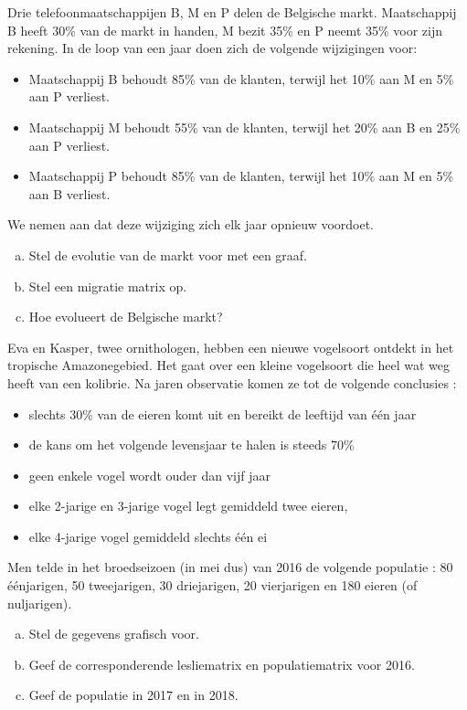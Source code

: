 \documentclass[12pt,twoside]{article}
\begin{document}
\begin{oefening}%
Drie telefoonmaatschappijen B, M en P delen de Belgische markt. Maatschappij B heeft 30\% van de markt in handen, M bezit 35\% en P neemt 35\% voor zijn rekening. In de loop van een jaar doen zich de volgende wijzigingen voor:
\begin{itemize}
  \item Maatschappij B behoudt 85\% van de klanten, terwijl het 10\% aan M en 5\% aan P verliest.
  \item Maatschappij M behoudt 55\% van de klanten, terwijl het 20\% aan B en 25\% aan P verliest.
  \item Maatschappij P behoudt 85\% van de klanten, terwijl het 10\% aan M en 5\% aan B verliest.
\end{itemize}
We nemen aan dat deze wijziging zich elk jaar opnieuw voordoet.

\begin{enumerate}[(a)]
  \item Stel de evolutie van de markt voor met een graaf.
  \item Stel een migratie matrix op.
  \item Hoe evolueert de Belgische markt?
\end{enumerate}
\end{oefening}

\begin{oefening}
Eva en Kasper, twee ornithologen, hebben een nieuwe vogelsoort ontdekt in het tropische Amazonegebied.  Het gaat over een kleine vogelsoort die heel wat weg heeft van een kolibrie.  Na jaren observatie komen ze tot de volgende conclusies :
\begin{itemize}
  \item slechts 30\% van de eieren komt uit en bereikt de leeftijd van één jaar
  \item de kans om het volgende levensjaar te halen is steeds 70\%
  \item geen enkele vogel wordt ouder dan vijf jaar
  \item elke 2-jarige en 3-jarige vogel legt gemiddeld twee eieren,
  \item elke 4-jarige vogel gemiddeld slechts één ei
\end{itemize}
Men telde in het broedseizoen (in mei dus) van 2016 de volgende populatie :
80 éénjarigen, 50 tweejarigen, 30 driejarigen, 20 vierjarigen en 180 eieren (of nuljarigen).

\begin{enumerate}[(a)]
  \item Stel de gegevens grafisch voor.
  \item Geef de corresponderende lesliematrix en populatiematrix voor 2016.
  \item Geef de populatie in 2017 en in 2018.
\end{enumerate}
\end{oefening}
\end{document}
